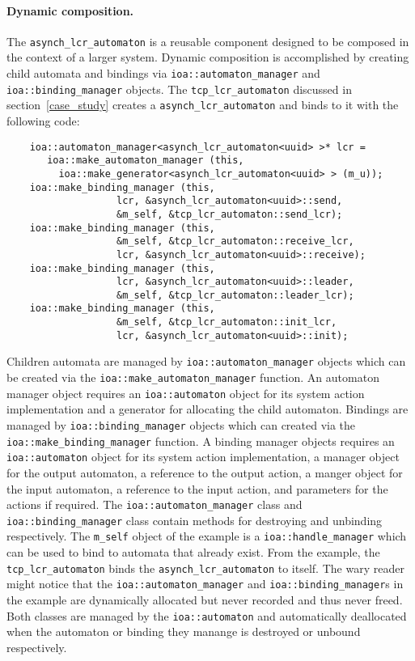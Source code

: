\paragraph{Dynamic composition.}
The \verb+asynch_lcr_automaton+ is a reusable component designed to be composed in the context of a larger system.
Dynamic composition is accomplished by creating child automata and bindings via \verb+ioa::automaton_manager+ and \verb+ioa::binding_manager+ objects.
The \verb+tcp_lcr_automaton+ discussed in section~\ref{case_study} creates a \verb+asynch_lcr_automaton+ and binds to it with the following code:
\begin{lstlisting}
    ioa::automaton_manager<asynch_lcr_automaton<uuid> >* lcr =
       ioa::make_automaton_manager (this,
         ioa::make_generator<asynch_lcr_automaton<uuid> > (m_u));
    ioa::make_binding_manager (this,
			       lcr, &asynch_lcr_automaton<uuid>::send,
			       &m_self, &tcp_lcr_automaton::send_lcr);
    ioa::make_binding_manager (this,
			       &m_self, &tcp_lcr_automaton::receive_lcr,
			       lcr, &asynch_lcr_automaton<uuid>::receive);
    ioa::make_binding_manager (this,
			       lcr, &asynch_lcr_automaton<uuid>::leader,
			       &m_self, &tcp_lcr_automaton::leader_lcr);
    ioa::make_binding_manager (this,
			       &m_self, &tcp_lcr_automaton::init_lcr,
			       lcr, &asynch_lcr_automaton<uuid>::init);
\end{lstlisting}
Children automata are managed by \verb+ioa::automaton_manager+ objects which can be created via the \verb+ioa::make_automaton_manager+ function.
An automaton manager object requires an \verb+ioa::automaton+ object for its system action implementation and a generator for allocating the child automaton.
Bindings are managed by \verb+ioa::binding_manager+ objects which can created via the \verb+ioa::make_binding_manager+ function.
A binding manager objects requires an \verb+ioa::automaton+ object for its system action implementation, a manager object for the output automaton, a reference to the output action, a manger object for the input automaton, a reference to the input action, and parameters for the actions if required.
The \verb+ioa::automaton_manager+ class and \verb+ioa::binding_manager+ class contain methods for destroying and unbinding respectively.
The \verb+m_self+ object of the example is a \verb+ioa::handle_manager+ which can be used to bind to automata that already exist.
From the example, the \verb+tcp_lcr_automaton+ binds the \verb+asynch_lcr_automaton+ to itself.
The wary reader might notice that the \verb+ioa::automaton_manager+ and \verb+ioa::binding_manager+s in the example are dynamically allocated but never recorded and thus never freed.
Both classes are managed by the \verb+ioa::automaton+ and automatically deallocated when the automaton or binding they manange is destroyed or unbound respectively.

